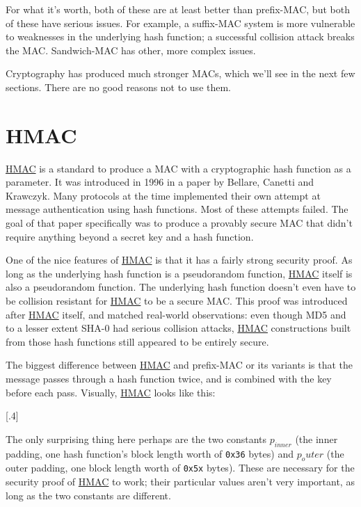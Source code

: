 \documentclass[11pt,ebook,table,dvipsnames]{memoir}
\begin{document}
For what it's worth, both of these are at least better than
prefix-MAC, but both of these have serious issues. For example, a
suffix-MAC system is more vulnerable to weaknesses in the underlying
hash function; a successful collision attack breaks the MAC.
Sandwich-MAC has other, more complex issues.

Cryptography has produced much stronger MACs, which we'll see in the
next few sections. There are no good reasons not to use them.
\section{\label{HMAC}HMAC}
\label{sec-2-7-4}

\hyperref[HMAC]{HMAC} is a standard to produce a MAC with a cryptographic hash function
as a parameter. It was introduced in 1996 in a paper by Bellare,
Canetti and Krawczyk. Many protocols at the time implemented their own
attempt at message authentication using hash functions. Most of these
attempts failed. The goal of that paper specifically was to produce a
provably secure MAC that didn't require anything beyond a secret key
and a hash function.

One of the nice features of \hyperref[HMAC]{HMAC} is that it has a fairly strong
security proof. As long as the underlying hash function is a
pseudorandom function, \hyperref[HMAC]{HMAC} itself is also a pseudorandom function.
The underlying hash function doesn't even have to be collision
resistant for \hyperref[HMAC]{HMAC} to be a secure MAC. \cite{hmac:proof2} This proof
was introduced after \hyperref[HMAC]{HMAC} itself, and matched real-world observations:
even though MD5 and to a lesser extent SHA-0 had serious collision
attacks, \hyperref[HMAC]{HMAC} constructions built from those hash functions still
appeared to be entirely secure.

The biggest difference between \hyperref[HMAC]{HMAC} and prefix-MAC or its variants is
that the message passes through a hash function twice, and is combined
with the key before each pass. Visually, \hyperref[HMAC]{HMAC} looks like this:

[.4]

The only surprising thing here perhaps are the two constants
$p_{inner}$ (the inner padding, one hash function's block length worth
of \verb~0x36~ bytes) and $p_outer$ (the outer padding, one block length
worth of \verb~0x5x~ bytes). These are necessary for the security proof of
\hyperref[HMAC]{HMAC} to work; their particular values aren't very important, as long
as the two constants are different.
\end{document}
